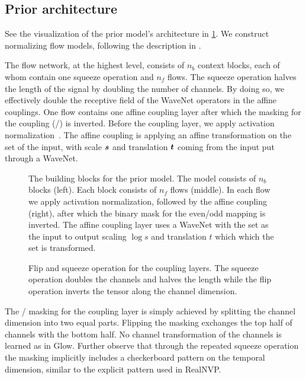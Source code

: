 \subsection{Prior architecture}

See the visualization of the prior model's architecture in \cref{fig:prior_network}. We construct normalizing flow models, following the description in \textcite{kimFloWaveNet2019a}.

The flow network, at the highest level, consists of \(n_b\) context blocks, each of whom contain one squeeze operation and \(n_f\) flows. The squeeze operation halves the length of the signal by doubling the number of channels. By doing so, we effectively double the receptive field of the WaveNet operators in the affine couplings. One flow contains one affine coupling layer after which the masking for the coupling (/) is inverted. Before the coupling layer, we apply activation normalization~\cite{kingmaGlow2018}. The affine coupling is applying an affine transformation on the  set of the input, with scale \(\s\) and translation \(\B{t}\) coming from the  input put through a  WaveNet.

\begin{figure}[t]
    
    \caption{The building blocks for the prior model. The model consists of \(n_b\) blocks (left). Each block consists of \(n_f\) flows (middle). In each flow we apply activation normalization, followed by the affine coupling (right), after which the binary mask for the even/odd mapping is inverted. The affine coupling layer uses a WaveNet with the  set as the input to output scaling \(\log s\) and translation \(t\) which which the  set is transformed.}%
    \label{fig:prior_network}
\end{figure}

\begin{figure}
    \hspace*{-25pt}%
    \caption{Flip and squeeze operation for the coupling layers. The squeeze operation doubles the channels and halves the length while the flip operation inverts the tensor along the channel dimension.}%
    \label{fig:squeeze}%
\end{figure}

The / masking for the coupling layer is simply achieved by splitting the channel dimension into two equal parts. Flipping the masking exchanges the top half of channels with the bottom half. No channel transformation of the channels is learned as in Glow. Further observe that through the repeated squeeze operation the masking implicitly includes a checkerboard pattern on the temporal dimension, similar to the explicit pattern used in RealNVP\@.

